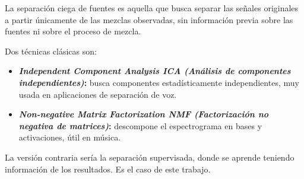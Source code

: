 La separación ciega de fuentes es aquella que busca separar las señales originales a partir únicamente de las mezclas observadas, sin información previa sobre las fuentes ni sobre el proceso de mezcla.\cite{cardoso1998blind}

Dos técnicas clásicas son:
\begin{itemize}
    \item \textbf{\textit{Independent Component Analysis ICA (Análisis de componentes independientes)}:} busca componentes estadísticamente independientes, muy usada en aplicaciones de separación de voz.

    \item \textbf{\textit{Non-negative Matrix Factorization NMF (Factorización no negativa de matrices)}:} descompone el espectrograma en bases y activaciones, útil en música.
    
\end{itemize}

La versión contraria sería la separación supervisada, donde se aprende teniendo información de los resultados. Es el caso de este trabajo.
